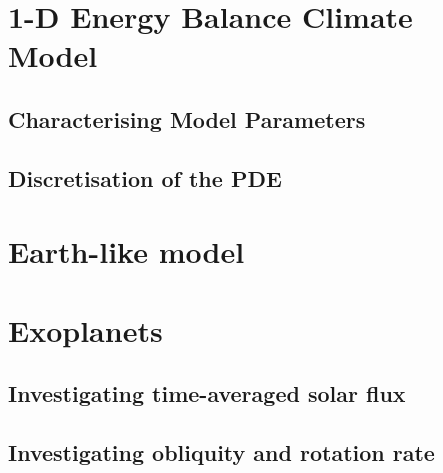 \documentclass[12pt, onecolumn]{revtex4-2}    %
\begin{document}
\section{1-D Energy Balance Climate Model}\label{sec:1DEBCM}
\subsection{Characterising Model Parameters} \label{ssec:CharacterisingModelParameters} %
\subsection{Discretisation of the PDE} \label{ssec:DiscretisationPDE}

\section{Earth-like model} \label{sec:EarthLikeModel}

\section{Exoplanets} \label{sec:Exoplanets}
\subsection{Investigating time-averaged solar flux} \label{ssec:InvTimeAveragedSolarFlux}
\subsection{Investigating obliquity and rotation rate}\label{ssec:InvObliquityRotationRate}
\end{document}
